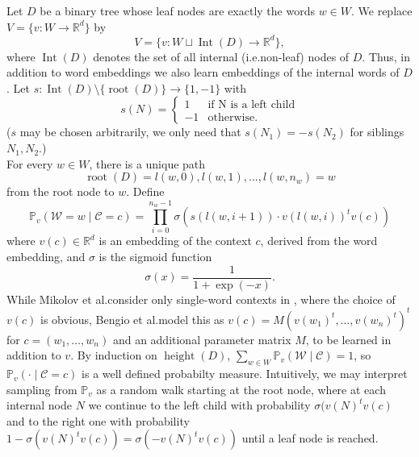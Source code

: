 \documentclass{amsart}
\theoremstyle{plain}
\theoremstyle{definition}
\newcommand{\R}{\mathbb{R}}
\renewcommand{\P}{\mathbb{P}}
\DeclareMathOperator{\Int}{Int}
\DeclareMathOperator{\rootnode}{root}
\DeclareMathOperator{\height}{height}
\begin{document}
Let $D$ be a binary tree whose leaf nodes are exactly the words $w \in W$.
We replace $V = \{ v : W \rightarrow \R^d \}$ by 
\begin{equation*}
  V = \{ v : W \sqcup \Int(D) \rightarrow \R^d \},
\end{equation*}
where $\Int(D)$ denotes the set of all internal (i.e.\@ non-leaf) nodes of $D$.
Thus, in addition to word embeddings we also learn embeddings of the internal words of $D$.
Let $s :\Int(D) \setminus \{\rootnode(D)\} \rightarrow \{1, -1\}$ with 
\begin{equation*}
  s(N) = \begin{cases}
    1 & \text{if N is a left child} \\
    -1 & \text{otherwise.}
      \end{cases}
\end{equation*}
($s$ may be chosen arbitrarily, we only need that $s(N_1) = -s(N_2)$ for siblings $N_1, N_2$.) \\
For every $w \in W$, there is a unique path 
\begin{equation*}
  \rootnode(D) = l(w, 0), l(w, 1), \dots, l(w, n_w) = w
\end{equation*}
from the root node to $w$.
Define
\begin{equation}
  \P_v(\mathcal{W} = w \mid \mathcal{C} = c) = \prod_{i = 0}^{n_w - 1} \sigma \left(s(l(w, i + 1)) \cdot v(l(w, i))^t v(c) \right)
\end{equation}
where $v(c) \in \R^d$ is an embedding of the context $c$, derived from the word embedding, and $\sigma$ is the sigmoid function
\begin{equation*}
  \sigma(x) = \frac{1}{1 + \exp(-x)}.
\end{equation*}
While Mikolov et al.\@ consider only single-word contexts in \cite{DBLP:journals/corr/MikolovSCCD13} , where the choice of $v(c)$ is obvious, Bengio et al.\@ model this as $v(c) = M (v(w_1)^t, \dots, v(w_n)^t)^t$ for $c = (w_1, \dots, w_n)$ and an additional parameter matrix $M$, to be learned in addition to $v$.
By induction on $\height(D)$, $\sum_{w \in W} \P_v(\mathcal{W} \mid \mathcal{C}) = 1$, so $\P_v(\cdot \mid \mathcal{C} = c)$ is a well defined probabilty measure.
Intuitively, we may interpret sampling from $\P_v$ as a random walk starting at the root node, where at each internal node $N$ we continue to the left child with probability $\sigma(v(N)^t v(c)$ and to the right one with probability $1 - \sigma(v(N)^t v(c)) = \sigma(- v(N)^t v(c))$ until a leaf node is reached.
\end{document}
